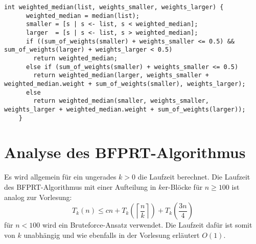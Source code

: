 \documentclass[a4paper,10pt]{scrartcl}
\begin{document}
\begin{enumerate}
	\begin{lstlisting}[numbers=none]
	int weighted_median(list, weights_smaller, weights_larger) {
	  weighted_median = median(list);
	  smaller = [s | s <- list, s < weighted_median];
	  larger  = [s | s <- list, s > weighted_median];
	  if ((sum_of_weights(smaller) + weights_smaller <= 0.5) && sum_of_weights(larger) + weights_larger < 0.5)
	    return weighted_median;
	  else if (sum_of_weights(smaller) + weights_smaller <= 0.5)
	    return weighted_median(larger, weights_smaller + weighted_median.weight + sum_of_weights(smaller), weights_larger);
	  else
	    return weighted_median(smaller, weights_smaller, weights_larger + weighted_median.weight + sum_of_weights(larger));
	}
	\end{lstlisting}

\end{enumerate}

\section{Analyse des BFPRT-Algorithmus}
Es wird allgemein für ein ungerades $k > 0$ die Laufzeit berechnet.
Die Laufzeit des BFPRT-Algorithmus mit einer Aufteilung in $k$er-Blöcke für $n \geq 100$ ist analog zur Vorlesung:
\[T_k(n) \leq cn + T_k\left(\left\lceil\frac{n}{k}\right\rceil\right) + T_k\left(\frac{3n}{4}\right)\]
für $n < 100$ wird ein Bruteforce-Ansatz verwendet. Die Laufzeit dafür ist somit von $k$ unabhängig und wie ebenfalls in der Vorlesung erläutert $O(1)$.
\end{document}
